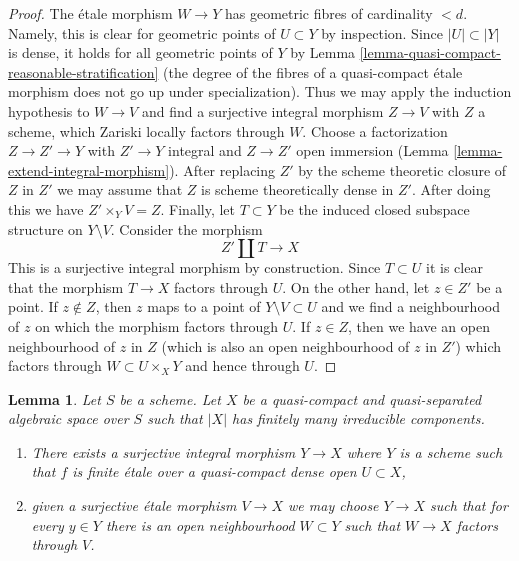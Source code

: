 \documentclass{stacks-project}
\theoremstyle{plain}
\newtheorem{lemma}[subsection]{Lemma}
\theoremstyle{definition}
\theoremstyle{remark}
\numberwithin{equation}{subsection}
\begin{document}
\begin{proof}
\medskip\noindent
The \'etale morphism $W \to Y$ has geometric fibres of cardinality $< d$.
Namely, this is clear for geometric points of $U \subset Y$ by inspection.
Since $|U| \subset |Y|$ is dense, it holds for all geometric points of $Y$
by Lemma \ref{lemma-quasi-compact-reasonable-stratification}
(the degree of the fibres of a quasi-compact \'etale morphism
does not go up under specialization). Thus we may apply the induction
hypothesis to $W \to V$ and find a surjective integral morphism
$Z \to V$ with $Z$ a scheme, which Zariski locally factors through $W$.
Choose a factorization $Z \to Z' \to Y$ with $Z' \to Y$ integral and
$Z \to Z'$ open immersion
(Lemma \ref{lemma-extend-integral-morphism}).
After replacing $Z'$ by the scheme theoretic closure of $Z$ in $Z'$
we may assume that $Z$ is scheme theoretically dense in $Z'$.
After doing this we have $Z' \times_Y V = Z$. Finally,
let $T \subset Y$ be the induced closed subspace structure on $Y \setminus V$.
Consider the morphism
$$
Z' \amalg T \longrightarrow X
$$
This is a surjective integral morphism by construction.
Since $T \subset U$ it is clear that the morphism $T \to X$
factors through $U$. On the other hand, let $z \in Z'$
be a point. If $z \not \in Z$, then $z$ maps to a point of
$Y \setminus V \subset U$ and we find a neighbourhood of $z$
on which the morphism factors through $U$.
If $z \in Z$, then we have an open neighbourhood of $z$ in $Z$
(which is also an open neighbourhood of $z$ in $Z'$)
which factors through $W \subset U \times_X Y$ and hence through $U$.
\end{proof}

\begin{lemma}
\label{lemma-there-is-a-scheme-integral-over-refined}
Let $S$ be a scheme. Let $X$ be a quasi-compact and quasi-separated
algebraic space over $S$ such that $|X|$ has finitely many irreducible
components.
\begin{enumerate}
\item There exists a surjective integral morphism $Y \to X$ where $Y$
is a scheme such that $f$ is finite \'etale over a quasi-compact
dense open $U \subset X$,
\item given a surjective \'etale morphism $V \to X$ we may choose
$Y \to X$ such that for every $y \in Y$ there is an open neighbourhood
$W \subset Y$ such that $W \to X$ factors through $V$.
\end{enumerate}
\end{lemma}
\end{document}
